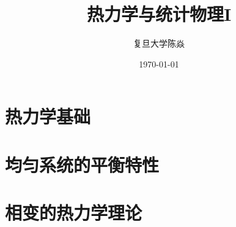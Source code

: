 \documentclass[UTF8]{ctexbook}
\title{
	\vspace{-4 cm}
	\bfseries
	热力学与统计物理I
}
\author{
	\CJKfamily{楷体}
	复旦大学\phantom{空格}陈焱
}
\date{
	\CJKfamily{楷体}
	\today
}
\numberwithin{equation}{section}
\theoremstyle{empty} %
\theoremstyle{empty} %
\theoremstyle{plain} %
\let \oldInclude = 
\renewcommand{}[1]{{\let \clearpage = \relax \oldInclude{#1}}}
\begin{document}
%	
%			
%			
%			
%			
%			
		\chapter{热力学基础}
			
			
		\chapter{均匀系统的平衡特性}
			
			
		\chapter{相变的热力学理论}
			
			
%			
%			
%			
		
%			
%		
%			
%		
%			
		
\end{document}
